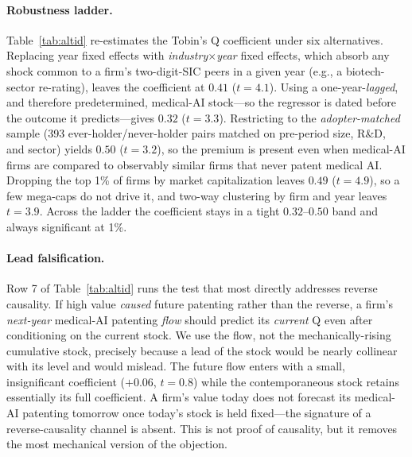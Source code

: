 \documentclass[12pt]{article}
\begin{document}
\paragraph{Robustness ladder.} Table~\ref{tab:altid} re-estimates the Tobin's Q coefficient under
six alternatives. Replacing year fixed effects with \emph{industry$\times$year} fixed effects,
which absorb any shock common to a firm's two-digit-SIC peers in a given year (e.g., a
biotech-sector re-rating), leaves the coefficient at $0.41$ ($t=4.1$). Using a
one-year-\emph{lagged}, and therefore predetermined, medical-AI stock---so the regressor is dated
before the outcome it predicts---gives $0.32$ ($t=3.3$). Restricting to the \emph{adopter-matched}
sample (393 ever-holder/never-holder pairs matched on pre-period size, R\&D, and sector) yields
$0.50$ ($t=3.2$), so the premium is present even when medical-AI firms are compared to observably
similar firms that never patent medical AI. Dropping the top 1\% of firms by market capitalization
leaves $0.49$ ($t=4.9$), so a few mega-caps do not drive it, and two-way clustering by firm and
year leaves $t=3.9$. Across the ladder the coefficient stays in a tight $0.32$--$0.50$ band and
always significant at 1\%.

\paragraph{Lead falsification.} Row 7 of Table~\ref{tab:altid} runs the test that most directly
addresses reverse causality. If high value \emph{caused} future patenting rather than the reverse,
a firm's \emph{next-year} medical-AI patenting \emph{flow} should predict its \emph{current} Q even
after conditioning on the current stock. We use the flow, not the mechanically-rising cumulative
stock, precisely because a lead of the stock would be nearly collinear with its level and would
mislead. The future flow enters with a small, insignificant coefficient ($+0.06$, $t=0.8$) while
the contemporaneous stock retains essentially its full coefficient. A firm's value today does not
forecast its medical-AI patenting tomorrow once today's stock is held fixed---the signature of a
reverse-causality channel is absent. This is not proof of causality, but it removes the most
mechanical version of the objection.
\end{document}
